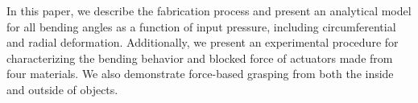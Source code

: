 
In this paper, we describe the fabrication process and present an analytical model for all bending angles as a function of input pressure, including circumferential and radial deformation. Additionally, we present an experimental procedure for characterizing the bending behavior and blocked force of actuators made from four materials. We also demonstrate force-based grasping from both the inside and outside of objects. 